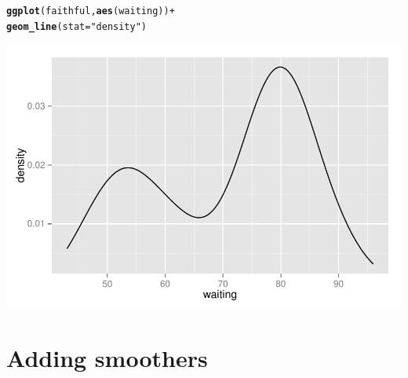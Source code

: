 \documentclass{beamer}\usepackage[]{graphicx}\usepackage[]{color}
\makeatletter
\newcommand{\hlstr}[1]{\textcolor[rgb]{0.192,0.494,0.8}{#1}}%
\newcommand{\hlopt}[1]{\textcolor[rgb]{0,0,0}{#1}}%
\newcommand{\hlstd}[1]{\textcolor[rgb]{0.345,0.345,0.345}{#1}}%
\newcommand{\hlkwc}[1]{\textcolor[rgb]{0.333,0.667,0.333}{#1}}%
\newcommand{\hlkwd}[1]{\textcolor[rgb]{0.737,0.353,0.396}{\textbf{#1}}}%
\newenvironment{kframe}{%
 \def\at@end@of@kframe{}%
 \ifinner\ifhmode%
  \def\at@end@of@kframe{\end{minipage}}%
  \begin{minipage}{\columnwidth}%
 \fi\fi%
 \def\FrameCommand##1{\hskip\@totalleftmargin \hskip-\fboxsep
 \colorbox{shadecolor}{##1}\hskip-\fboxsep
     \hskip-\linewidth \hskip-\@totalleftmargin \hskip\columnwidth}%
 \MakeFramed {\advance\hsize-\width
   \@totalleftmargin\z@ \linewidth\hsize
   \@setminipage}}%
 {\par\unskip\endMakeFramed%
 \at@end@of@kframe}
\newenvironment{knitrout}{}{} %
\makeatother
\begin{document}
\begin{frame}[fragile]
\begin{knitrout}\footnotesize
{}\color{fgcolor}\begin{kframe}
\begin{alltt}
\hlkwd{ggplot}\hlstd{(faithful,} \hlkwd{aes}\hlstd{(waiting))} \hlopt{+}
\hlkwd{geom_line}\hlstd{(}\hlkwc{stat} \hlstd{=} \hlstr{"density"}\hlstd{)}
\end{alltt}
\end{kframe}

{\centering \includegraphics[width=.75\linewidth]{figure/densitytwo___} 

}



\end{knitrout}

\end{frame}


\section*{Adding smoothers}
\frame{\sectionpage}

\end{document}
